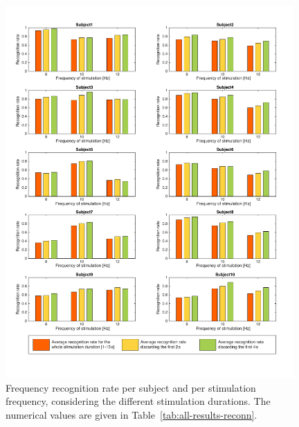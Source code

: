\documentclass[smallextended]{svjour3}
\begin{document}
\begin{figure}
\center
\includegraphics[width=0.98\textwidth]{figures/all-results-reconn.pdf}
\caption{Frequency recognition rate per subject and per stimulation frequency, considering the different stimulation durations. The numerical values are given in Table~\ref{tab:all-results-reconn}.}
\label{fig:all-results-reconn}
\end{figure}
\end{document}
